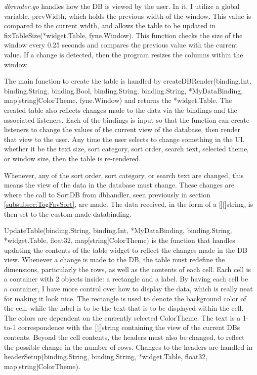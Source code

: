 \textit{dbrender.go} handles how the DB is viewed by the user.
In it, I utilize a global variable, prevWidth, which holds the
previous width of the window. This value is compared to the current
width, and allows the table to be updated in
fixTableSize(*widget.Table, fyne.Window).
This function checks the size of the window every 0.25 seconds and
compares the previous value with the current value. If a change is
detected, then the program resizes the columns within the window.

The main function to create the table is handled by
createDBRender(binding.Int, binding.String, binding.Bool,
	binding.String, binding.String, *MyDataBinding,
map[string]ColorTheme, fyne.Window) and returns the *widget.Table.
The created table also reflects changes made to the data via the
bindings and the associated listeners.
Each of the bindings is input so that the function can create
listeners to change the values of the current view of the database,
then render that view to the user. Any time the user selects to
change something in the UI, whether it be the text size, sort
category, sort order, search text, selected theme, or window size,
then the table is re-rendered.

Whenever, any of the sort order, sort category, or search text are
changed, this means the view of the data in the database must change.
These changes are where the call to SortDB from dbhandler, seen
previously in section \ref{subsubsec:TogFavSort}, are made. The data
received, in the form of a [][]string, is then set to the custom-made
databinding.

UpdateTable(binding.String, binding.Int, *MyDataBinding,
binding.String, *widget.Table, float32, map[string]ColorTheme) is the
function that handles updating the contents of the table widget to
reflect the changes made in the DB view.
Whenever a change is made to the DB, the table must redefine the
dimensions, particularly the rows, as well as the contents of each
cell. Each cell is a container with 2 objects inside: a rectangle and
a label. By having each cell be a container, I have more control over
how to display the data, which is really neat for making it look
nice. The rectangle is used to denote the background color of the
cell, while the label is to be the text that is to be displayed
within the cell. The colors are dependent on the currently selected
ColorTheme. The text is a 1-to-1 correspondence with the [][]string
containing the view of the current DBs contents. Beyond the cell contents,
the headers must also be changed, to reflect the possible
change in the number of rows. Changes to the headers are handled in
headerSetup(binding.String, binding.String, *widget.Table, float32,
map[string]ColorTheme).

